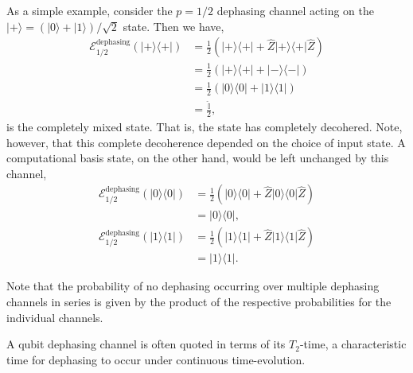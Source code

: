 \documentclass[aps,rmp,twocolumn,amsmath,amssymb,nofootinbib,superscriptaddress,longbibliography,floatfix]{revtex4-1}
\newcommand{\bra}[1]{\langle#1|}
\newcommand{\ket}[1]{|#1\rangle}
\begin{document}
As a simple example, consider the \mbox{$p=1/2$} dephasing channel acting on the \mbox{$\ket{+} = (\ket{0}+\ket{1})/\sqrt{2}$} state. Then we have,
\begin{align}
\mathcal{E}^\mathrm{dephasing}_{1/2}(\ket{+}\bra{+}) &= \frac{1}{2} (\ket{+}\bra{+} + \hat{Z}\ket{+}\bra{+}\hat{Z}) \nonumber \\
&= \frac{1}{2} (\ket{+}\bra{+} + \ket{-}\bra{-}) \nonumber \\
&= \frac{1}{2} (\ket{0}\bra{0} + \ket{1}\bra{1}) \nonumber \\
&= \frac{\mathbb{\hat{I}}}{2},
\end{align}
is the completely mixed state. That is, the state has completely decohered. Note, however, that this complete decoherence depended on the choice of input state. A computational basis state, on the other hand, would be left unchanged by this channel,
\begin{align}
\mathcal{E}^\mathrm{dephasing}_{1/2}(\ket{0}\bra{0}) &= \frac{1}{2} (\ket{0}\bra{0} + \hat{Z}\ket{0}\bra{0}\hat{Z}) \nonumber \\
&= \ket{0}\bra{0}, \nonumber \\
\mathcal{E}^\mathrm{dephasing}_{1/2}(\ket{1}\bra{1}) &= \frac{1}{2} (\ket{1}\bra{1} + \hat{Z}\ket{1}\bra{1}\hat{Z}) \nonumber \\
&= \ket{1}\bra{1}.
\end{align}

Note that the probability of no dephasing occurring over multiple dephasing channels in series is given by the product of the respective probabilities for the individual channels.

A qubit dephasing channel is often quoted in terms of its $T_2$-time, a characteristic time for dephasing to occur under continuous time-evolution.
\end{document}
